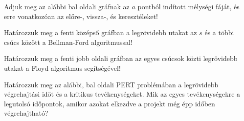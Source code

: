\documentclass[a4paper,12pt]{article}
\begin{document}
    \noindent{}
    \noindent{}
    \begin{enumerate}
        \item Adjuk meg az alábbi bal oldali gráfnak az $a$ pontból indított mélységi fáját, és erre vonatkozóan az előre-, vissza-, és keresztéleket!
        \begin{figure}[!h]
            \centering
            \begin{subfigure}{0.3\textwidth}
                \centering
                
            \end{subfigure}
            \begin{subfigure}{0.3\textwidth}
                \centering
                
            \end{subfigure}
            \begin{subfigure}{0.3\textwidth}
                \centering
                
            \end{subfigure}
        \end{figure}

        \begin{minipage}{0.45\textwidth}
            \item Határozzuk meg a fenti középső gráfban a legrövidebb utakat az $s$ és a többi csúcs között a Bellman-Ford algoritmussal!
        \end{minipage}\hfill
        \begin{minipage}{0.45\textwidth}
            \item Határozzuk meg a fenti jobb oldali gráfban az egyes csúcsok közti legrövidebb utakat a Floyd algoritmus segítségével!
        \end{minipage}
        
        \item Határozzuk meg az alábbi, bal oldali PERT problémában a legrövidebb végrehajtási időt és a kritikus tevékenységeket. Mik az egyes tevékenységekre a legutolsó időpontok, amikor azokat elkezdve a projekt még épp időben végrehajtható?
        \begin{figure}[!h]
            \centering
             \hspace{2cm}
            
        \end{figure}


\end{enumerate}
\end{document}

